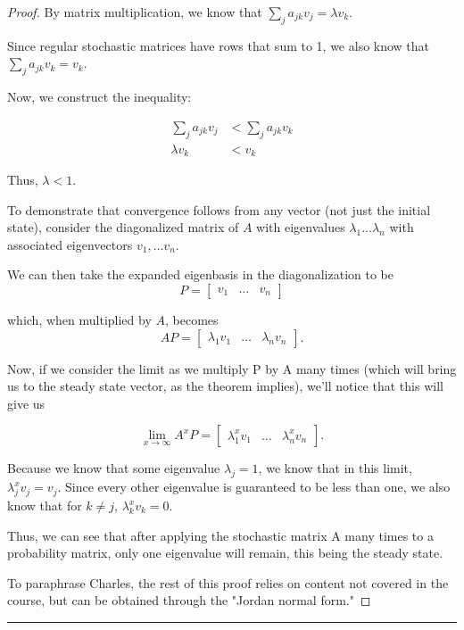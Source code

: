 \documentclass{article}
\begin{document}
\begin{enumerate}[label=]
\begin{proof}
    By matrix multiplication, we know that $\sum_{j}a_{jk}v_j=\lambda v_k$.

    Since regular stochastic matrices have rows that sum to 1, we also know that $\sum_{j}a_{jk}v_k=v_k$.

    Now, we construct the inequality:

    \begin{align*}
        \sum_{j}a_{jk}v_j&<\sum_{j}a_{jk}v_k\\
        \lambda v_k&<v_k
    \end{align*}

    Thus, $\lambda < 1.$

    To demonstrate that convergence follows from any vector (not just the initial state), consider the diagonalized matrix of $A$ with eigenvalues $\lambda_1\ldots \lambda_n$ with associated eigenvectors $v_1, \ldots v_n$.

    We can then take the expanded eigenbasis in the diagonalization to be
\begin{equation}
    P=\begin{bmatrix}
        v_1& \ldots &v_n
    \end{bmatrix}
\end{equation}

    which, when multiplied by $A$, becomes
\begin{equation}
    AP=\begin{bmatrix}
        \lambda_1v_1&\ldots&\lambda_nv_n
    \end{bmatrix}.
\end{equation}

    Now, if we consider the limit as we multiply P by A many times (which will bring us to the steady state vector, as the theorem implies), we'll notice that this will give us

\begin{equation}
    \lim_{x\to\infty}A^xP=\begin{bmatrix}
        \lambda_1^xv_1&\ldots&\lambda_n^xv_n
    \end{bmatrix}.
\end{equation}

    Because we know that some eigenvalue $\lambda_j=1$, we know that in this limit, $\lambda_j^xv_j=v_j$. Since every other eigenvalue is guaranteed to be less than one, we also know that for $k\neq j$, $\lambda_k^xv_k=0$.

    Thus, we can see that after applying the stochastic matrix A many times to a probability matrix, only one eigenvalue will remain, this being the steady state.

    To paraphrase Charles, the rest of this proof relies on content not covered in the course, but can be obtained through the "Jordan normal form."
    
\end{proof}

\rule{\textwidth}{0.5pt}

\end{enumerate}
\end{document}
